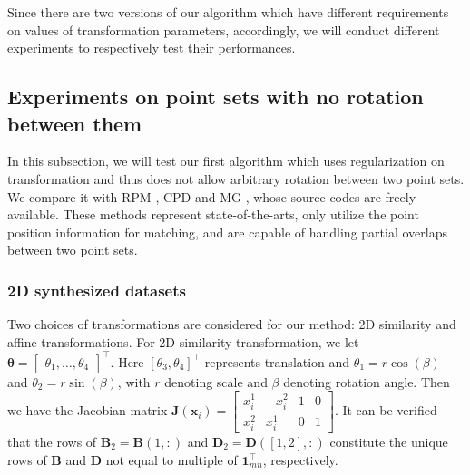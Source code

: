 \documentclass[11pt,bezier,]{article}
\begin{document}
Since there are two versions of  our algorithm 
which have different requirements on values of transformation parameters,
accordingly,
we will conduct different experiments to respectively test their performances.

\subsection{Experiments on point sets with no rotation between them }
In this subsection,
we will test our first algorithm which uses regularization on transformation 
and thus does not allow arbitrary rotation between two point sets.
We compare it with RPM \cite{RPM_TPS}, CPD \cite{CPD} and MG \cite{kernel_Gaussian}, 
whose source codes are freely available. 
These methods represent state-of-the-arts, 
only utilize the point position information for matching, and 
are capable of handling partial overlaps between two point sets.


\subsubsection{2D synthesized datasets \label{subsec:regu2Dtest}}


Two choices of transformations are considered for our method:
2D similarity  and affine transformations.
For 2D similarity transformation,
we let ${\boldsymbol\theta}=\begin{bmatrix} \theta_1, \ldots , \theta_4 \end{bmatrix}^\top$.
Here $[\theta_3, \theta_4]^\top$ represents  translation 
and  $\theta_1=r\cos(\beta)$ and $\theta_2=r\sin(\beta)$,
with  $r$ denoting  scale and $\beta$ denoting rotation angle.
Then we  have the Jacobian matrix
$\mathbf J(\mathbf x_i)=\begin{bmatrix}x_i^1&- x_i^2&1&0\\ x_i^2&x_i^1&0&1\end{bmatrix}$.
It can be verified that the rows of   
$\mathbf B_2=\mathbf B(1,:)$ and $\mathbf D_2=\mathbf D([1,2],:)$ 
constitute the unique  rows of $\mathbf B$ and $\mathbf D$
not equal to multiple of $\mathbf 1_{mn}^\top$, respectively.
\end{document}

